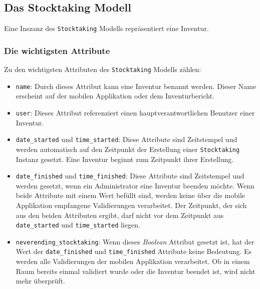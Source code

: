 \hypertarget{das-stocktaking-modell}{%
\subsection{Das Stocktaking Modell}\label{das-stocktaking-modell}}

Eine Inszanz des \texttt{Stocktaking} Modells repräsentiert eine
Inventur.

\hypertarget{die-wichtigsten-attribute-2}{%
\subsubsection{Die wichtigsten
Attribute}\label{die-wichtigsten-attribute-2}}

Zu den wichtigsten Attributen des \texttt{Stocktaking} Modells zählen:

\begin{itemize}
\tightlist
\item
  \texttt{name}: Durch dieses Attribut kann eine Inventur benannt
  werden. Dieser Name erscheint auf der mobilen Applikation oder dem
  Inventurbericht.
\item
  \texttt{user}: Dieses Attribut referenziert einen
  hauptverantwortlichen Benutzer einer Inventur.
\item
  \texttt{date\_started} und \texttt{time\_started}: Diese Attribute
  sind Zeitstempel und werden automatisch auf den Zeitpunkt der
  Erstellung einer \texttt{Stocktaking} Instanz gesetzt. Eine Inventur
  beginnt zum Zeitpunkt ihrer Erstellung.
\item
  \texttt{date\_finished} und \texttt{time\_finished}: Diese Attribute
  sind Zeitstempel und werden gesetzt, wenn ein Administrator eine
  Inventur beenden möchte. Wenn beide Attribute mit einem Wert befüllt
  sind, werden keine über die mobile Applikation empfangene
  Validierungen verarbeitet. Der Zeitpunkt, der sich aus den beiden
  Attributen ergibt, darf nicht vor dem Zeitpunkt aus
  \texttt{date\_started} und \texttt{time\_started} liegen.
\item
  \texttt{neverending\_stocktaking}: Wenn dieses
  \emph{Boolean}
  Attribut gesetzt ist, hat der Wert der \texttt{date\_finished} und
  \texttt{time\_finished} Attribute keine Bedeutung. Es werden alle
  Validierungen der mobilen Applikation verarbeitet. Ob in einem Raum
  bereits einmal validiert wurde oder die Inventur beendet ist, wird
  nicht mehr überprüft.
\end{itemize}

